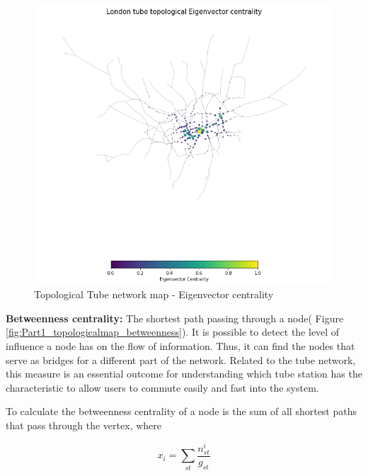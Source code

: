 \documentclass[10pt]{report}
\numberwithin{figure}{section}
\numberwithin{table}{section}
\begin{document}
        
    \begin{figure}[htp]
        \centering
        \includegraphics[width=14cm]{Image/Part1_topologicalmap_eigenvector.png}
        \caption{Topological Tube network map - Eigenvector centrality}
        \label{fig:Part1_topologicalmap_eigenvector}
    \end{figure} 

  
\newpage   
        \textbf{Betweenness centrality:} The shortest path passing through a node( Figure \ref{fig:Part1_topologicalmap_betweenness}). It is possible to detect the level of influence a node has on the flow of information\cite{arcaute_review_2022}. Thus, it can find the nodes that serve as bridges for a different part of the network. Related to the tube network, this measure is an essential outcome for understanding which tube station has the characteristic to allow users to commute easily and fast into the system.
        
        To calculate the betweenness centrality of a node is the sum of all shortest paths that pass through the vertex, where 
                    

\begin{equation}x_{i}=\sum_{st} \frac {n^{i}_{st}}{g_{st}}\end{equation}
        
\end{document}
